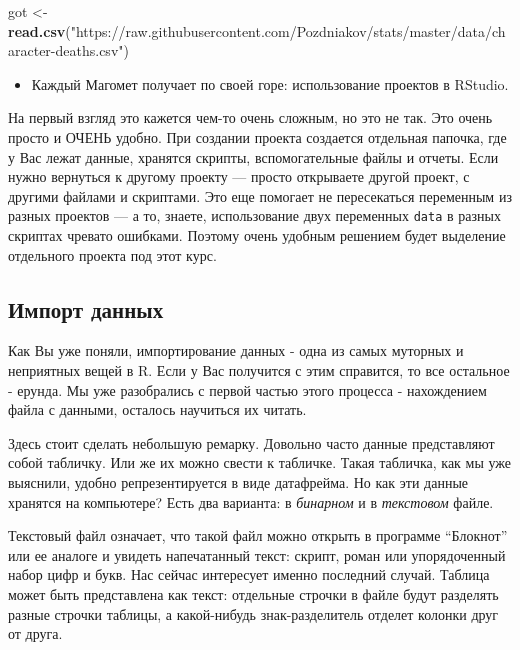 \documentclass[]{book}
\newenvironment{Shaded}{\begin{snugshade}}{\end{snugshade}}
\newcommand{\KeywordTok}[1]{\textcolor[rgb]{0.13,0.29,0.53}{\textbf{#1}}}
\newcommand{\NormalTok}[1]{#1}
\newcommand{\StringTok}[1]{\textcolor[rgb]{0.31,0.60,0.02}{#1}}
\providecommand{\tightlist}{%
  \setlength{\itemsep}{0pt}\setlength{\parskip}{0pt}}
\begin{document}
\begin{Shaded}
\begin{Highlighting}[]
\NormalTok{got <-}\StringTok{ }\KeywordTok{read.csv}\NormalTok{(}\StringTok{"https://raw.githubusercontent.com/Pozdniakov/stats/master/data/character-deaths.csv"}\NormalTok{)}
\end{Highlighting}
\end{Shaded}

\begin{itemize}
\tightlist
\item
  Каждый Магомет получает по своей горе: использование проектов в RStudio.
\end{itemize}

На первый взгляд это кажется чем-то очень сложным, но это не так. Это очень просто и ОЧЕНЬ удобно. При создании проекта создается отдельная папочка, где у Вас лежат данные, хранятся скрипты, вспомогательные файлы и отчеты. Если нужно вернуться к другому проекту --- просто открываете другой проект, с другими файлами и скриптами. Это еще помогает не пересекаться переменным из разных проектов --- а то, знаете, использование двух переменных \texttt{data} в разных скриптах чревато ошибками. Поэтому очень удобным решением будет выделение отдельного проекта под этот курс.

\hypertarget{import}{%
\subsection{Импорт данных}\label{import}}

Как Вы уже поняли, импортирование данных - одна из самых муторных и неприятных вещей в R. Если у Вас получится с этим справится, то все остальное - ерунда. Мы уже разобрались с первой частью этого процесса - нахождением файла с данными, осталось научиться их читать.

Здесь стоит сделать небольшую ремарку. Довольно часто данные представляют собой табличку. Или же их можно свести к табличке. Такая табличка, как мы уже выяснили, удобно репрезентируется в виде датафрейма. Но как эти данные хранятся на компьютере? Есть два варианта: в \emph{бинарном} и в \emph{текстовом} файле.

Текстовый файл означает, что такой файл можно открыть в программе ``Блокнот'' или ее аналоге и увидеть напечатанный текст: скрипт, роман или упорядоченный набор цифр и букв. Нас сейчас интересует именно последний случай. Таблица может быть представлена как текст: отдельные строчки в файле будут разделять разные строчки таблицы, а какой-нибудь знак-разделитель отделет колонки друг от друга.
\end{document}

